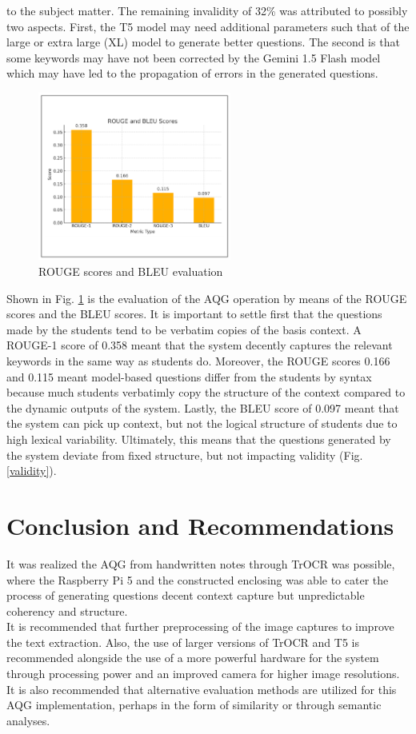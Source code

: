 \documentclass[conference]{IEEEtran}
\begin{document}
to the subject matter. The remaining invalidity of 32\% was attributed to 
possibly two aspects. First, the T5 model may need additional 
parameters such that of the large or extra large (XL) model 
to generate better questions. The second is that some keywords may have not been 
corrected by the Gemini 1.5 Flash model which may have led to the
propagation of errors in the generated questions.
\begin{figure}[H]
    \centerline{\includegraphics[width=2.5in]{eval.png}}
    \vspace{-0.3cm}
    \caption{ROUGE scores and BLEU evaluation} 
    \label{eval}
\end{figure}
\vspace{-0.3cm}
Shown in Fig. \ref{eval} is the evaluation of the AQG operation by means
of the ROUGE scores and the BLEU scores. 
It is important to settle first that the questions made by the 
students tend to be verbatim copies of the basis context. 
A ROUGE-1 score of 0.358 meant that the system decently captures 
the relevant keywords in the same way as students do. 
Moreover, the ROUGE scores 0.166
and 0.115 meant model-based questions differ from the 
students by syntax
because much students verbatimly copy 
the structure of the context compared to the dynamic outputs 
of the system. Lastly, the BLEU score of 0.097 meant that 
the system can pick up context, but not the logical structure 
of students due to high lexical variability. Ultimately, this means 
that the questions generated by the system deviate from fixed structure, 
but not impacting validity (Fig. \ref{validity}).

\section{Conclusion and Recommendations}
\indent It was realized the AQG from handwritten notes 
through TrOCR was possible, where the Raspberry Pi 5 
and the constructed enclosing
was able to cater the process of generating
questions decent context capture but unpredictable coherency and 
structure. \\
\indent It is recommended that further preprocessing of the image 
captures to improve the text extraction. Also, 
the use of larger versions of TrOCR and T5 is recommended 
alongside the use of a more powerful hardware for the system
through processing power and an improved camera for 
higher image resolutions. It is also recommended that 
alternative evaluation methods are utilized for this AQG 
implementation, perhaps in the form of similarity or through 
semantic analyses.





\end{document}
